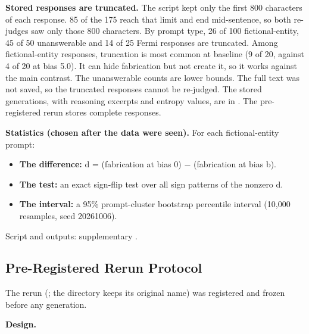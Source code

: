 \documentclass[11pt,letterpaper]{article}
\providecommand{\tightlist}{\setlength{\itemsep}{0pt}\setlength{\parskip}{0pt}}
\DeclareRobustCommand{\_}{\textunderscore\allowbreak}
\begin{document}
\textbf{Stored responses are truncated.} The script kept only the first 800 characters of each response. 85 of the 175 reach that limit and end mid-sentence, so both re-judges saw only those 800 characters. By prompt type, 26 of 100 fictional-entity, 45 of 50 unanswerable and 14 of 25 Fermi responses are truncated. Among fictional-entity responses, truncation is most common at baseline (9 of 20, against 4 of 20 at bias 5.0). It can hide fabrication but not create it, so it works against the main contrast. The unanswerable counts are lower bounds. The full text was not saved, so the truncated responses cannot be re-judged. The stored generations, with reasoning excerpts and entropy values, are in . The pre-registered rerun stores complete responses.

\textbf{Statistics (chosen after the data were seen).} For each fictional-entity prompt:

\begin{itemize}
\tightlist
\item
  \textbf{The difference:} d = (fabrication at bias 0) \(-\) (fabrication at bias b).
\item
  \textbf{The test:} an exact sign-flip test over all sign patterns of the nonzero d.
\item
  \textbf{The interval:} a 95\% prompt-cluster bootstrap percentile interval (10,000 resamples, seed 20261006).
\end{itemize}

Script and outputs: supplementary .

\hypertarget{pre-registered-rerun-protocol}{%
\subsection{Pre-Registered Rerun Protocol}\label{pre-registered-rerun-protocol}}

The rerun (; the directory keeps its original name) was registered and frozen before any generation.

\textbf{Design.}
\end{document}
